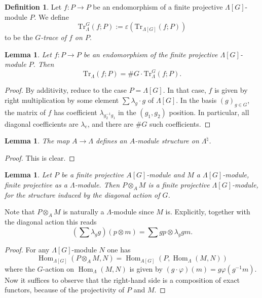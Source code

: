 \documentclass{stacks-project}
\theoremstyle{plain}
\newtheorem{lemma}[subsection]{Lemma}
\theoremstyle{definition}
\newtheorem{definition}[subsection]{Definition}
\theoremstyle{remark}
\numberwithin{equation}{subsection}
\def\Hom{\mathop{\mathrm{Hom}}\nolimits}
\begin{document}
\begin{definition}
\label{definition-trace-G}
Let $f : P\to P$ be an
endomorphism of a finite projective $\Lambda[G]$-module
$P$. We define
$$
\text{Tr}_{\Lambda}^G(f; P) := \varepsilon\left(\text{Tr}_{\Lambda[G]}(f;
P)\right)
$$
to be the {\it $G$-trace of $f$ on $P$}.
\end{definition}

\begin{lemma}
\label{lemma-lambda-trace}
Let $f : P\to P$ be an endomorphism of the finite projective
$\Lambda[G]$-module $P$. Then
$$
\text{Tr}_{\Lambda}(f; P) = \# G \cdot \text{Tr}_\Lambda^G(f; P).
$$
\end{lemma}

\begin{proof}
By additivity, reduce to the case $P = \Lambda[G]$.
In that case, $f$ is given by
right multiplication by some element $\sum\lambda_g\cdot g$ of $\Lambda[G]$. In
the basis $(g)_{g \in G}$, the matrix of $f$ has coefficient
$\lambda_{g_2^{-1}g_1}$ in the $(g_1, g_2)$ position. In particular, all
diagonal coefficients are $\lambda_e$, and there are $\# G$ such coefficients.
\end{proof}

\begin{lemma}
\label{lemma-A-module-structure}
The map $A\to \Lambda$ defines an $A$-module structure on $\Lambda^\natural$.
\end{lemma}

\begin{proof}
This is clear.
\end{proof}

\begin{lemma}
\label{lemma-diagonal-action-projective-module}
Let $P$ be a finite projective $A[G]$-module and $M$ a $\Lambda[G]$-module,
finite projective as a $\Lambda$-module. Then $P \otimes_A M$ is a finite
projective $\Lambda[G]$-module, for the structure induced by the diagonal
action of $G$.
\end{lemma}

\noindent
Note that $P \otimes_A M$ is naturally a $\Lambda$-module since $M$ is.
Explicitly, together with the diagonal action this reads
$$
\left(\sum\lambda_g g\right)\left(p \otimes m\right)
=
\sum g p \otimes \lambda_g g m.
$$

\begin{proof}
For any $\Lambda[G]$-module $N$ one has
$$
\Hom_{\Lambda[G]}\left(P \otimes_A M, N\right)= \Hom_{A[G]}\left(P,
\Hom_{\Lambda}(M, N)\right)
$$
where the $G$-action on $\Hom_{\Lambda}(M, N)$ is given by $(g\cdot
\varphi)(m) = g \varphi (g^{-1} m) $. Now it suffices to observe that the
right-hand side is a composition of exact functors, because of the projectivity
of $P$ and $M$.
\end{proof}
\end{document}

